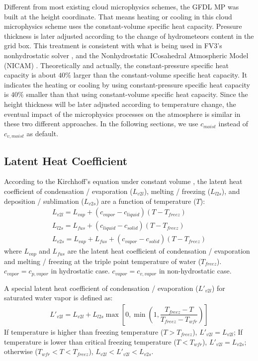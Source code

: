 \documentclass[letterpaper,titlepage,10pt]{article}
\numberwithin{equation}{section}
\begin{document}
Different from most existing cloud microphysics schemes, the GFDL MP was built at the height coordinate. That means heating or cooling in this cloud microphysics scheme uses the constant-volume specific heat capacity. Pressure thickness is later adjusted according to the change of hydrometeors content in the grid box. This treatment is consistent with what is being used in FV3's nonhydrostatic solver \citep{lin2004aver}, and the Nonhydrostatic ICosahedral Atmospheric Model (NICAM) \citep{satoh2008nonh}. Theoretically and actually, the constant-pressure specific heat capacity is about $40\%$ larger than the constant-volume specific heat capacity. It indicates the heating or cooling by using constant-pressure specific heat capacity is $40\%$ smaller than that using constant-volume specific heat capacity. Since the height thickness will be later adjusted according to temperature change, the eventual impact of the microphysics processes on the atmosphere is similar in these two different approaches. In the following sections, we use $c_{moist}$ instead of $c_{v,moist}$ as default.


\subsection{Latent Heat Coefficient}

According to the Kirchhoff's equation under constant volume \citep{emanuel1994atmo}, the latent heat coefficient of condensation / evaporation ($L_{v2l}$), melting / freezing ($L_{l2s}$), and deposition / sublimation ($L_{v2s}$) are a function of temperature ($T$):
\begin{gather}
	L_{v2l} = L_{vap} + \left(c_{vapor} - c_{liquid} \right) \left( T - T_{freez} \right) \\
	L_{l2s} = L_{fus} + \left(c_{liquid} - c_{solid} \right) \left( T - T_{freez} \right) \\
	L_{v2s} = L_{vap} + L_{fus} + \left(c_{vapor} - c_{solid} \right) \left( T - T_{freez} \right)
\end{gather}
where $L_{vap}$ and $L_{fus}$ are the latent heat coefficient of condensation / evaporation and melting / freezing at the triple point temperature of water ($T_{freez}$). $c_{vapor} = c_{p,vapor}$ in hydrostatic case. $c_{vapor} = c_{v,vapor}$ in non-hydrostatic case.

A special latent heat coefficient of condensation / evaporation ($L'_{v2l}$) for saturated water vapor is defined as:
\begin{gather}
	L'_{v2l} = L_{v2l} + L_{l2s} \max \left[0, \min \left(1, \dfrac{T_{freez} - T}{T_{freez} - T_{wfr}} \right) \right]
\end{gather}
If temperature is higher than freezing temperature ($T > T_{freez}$), $L'_{v2l} = L_{v2l}$; If temperature is lower than critical freezing temperature ($T < T_{wfr}$), $L'_{v2l} = L_{v2s}$; otherwise ($T_{wfr}< T < T_{freez}$), $L_{v2l}< L'_{v2l} < L_{v2s}$.  
\end{document}
